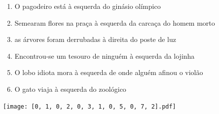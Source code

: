 \documentclass[12pt]{article}
\begin{document}
		 

\pagebreak


	\begin{enumerate}
		  \sffamily %
		  \large %


\vfill \item
O pagodeiro está	%
à esquerda
do ginásio olímpico	%

\vfill \item
Semearam flores na praça	%
à esquerda
da carcaça do homem morto	%

\vfill \item
as árvores foram derrubadas	%
à direita
do poste de luz	%

\vfill \item
Encontrou-se um tesouro de ninguém	%
à esquerda
da lojinha	%

\vfill \item
O lobo idiota mora	%
à esquerda
de onde alguém afinou o violão	%

\vfill \item
O gato viaja	%
à esquerda
do zoológico	%
	\end{enumerate}
		  
		  \hfill

		  \vfill

\texttt{[image: [0, 1, 0, 2, 0, 3, 1, 0, 5, 0, 7, 2].pdf]}


	\hfill	  	  


\pagebreak			
\end{document}
